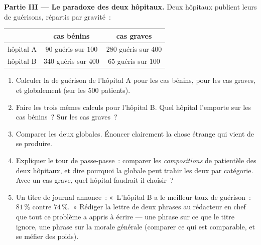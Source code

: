 \begin{problem}
\medskip
\noindent\textbf{Partie III --- Le paradoxe des deux hôpitaux.}
Deux hôpitaux publient leurs  de guérisons, répartis par
gravité~:
\begin{center}
\renewcommand{\arraystretch}{1.3}
\begin{tabular}{l|cc}
 & cas bénins & cas graves \\
\hline
hôpital A & $90$ guéris sur $100$ & $280$ guéris sur $400$ \\
hôpital B & $340$ guéris sur $400$ & $65$ guéris sur $100$ \\
\end{tabular}
\end{center}
\begin{enumerate}[resume]
  \item Calculer la  de guérison de l'hôpital A pour les cas
        bénins, pour les cas graves, et globalement (sur les $500$
        patients).
  \item Faire les trois mêmes calculs pour l'hôpital B. Quel hôpital
        l'emporte sur les cas bénins~? Sur les cas graves~?
  \item Comparer les deux  globales. Énoncer clairement la
        chose étrange qui vient de se produire.
  \item Expliquer le tour de passe-passe~: comparer les
        \emph{compositions} de patientèle des deux hôpitaux, et dire
        pourquoi la  globale peut trahir les deux 
        par catégorie. Avec un cas grave, quel hôpital
        faudrait-il choisir~?
  \item Un titre de journal annonce~: «~L'hôpital B a le meilleur
        taux de guérison~: $81\,\%$ contre $74\,\%$.~» Rédiger la
        lettre de deux phrases au rédacteur en chef que tout ce
        problème a appris à écrire --- une phrase sur ce que le titre
        ignore, une phrase sur la morale générale (comparer ce qui
        est comparable, et se méfier des poids).
\end{enumerate}
\end{problem}
